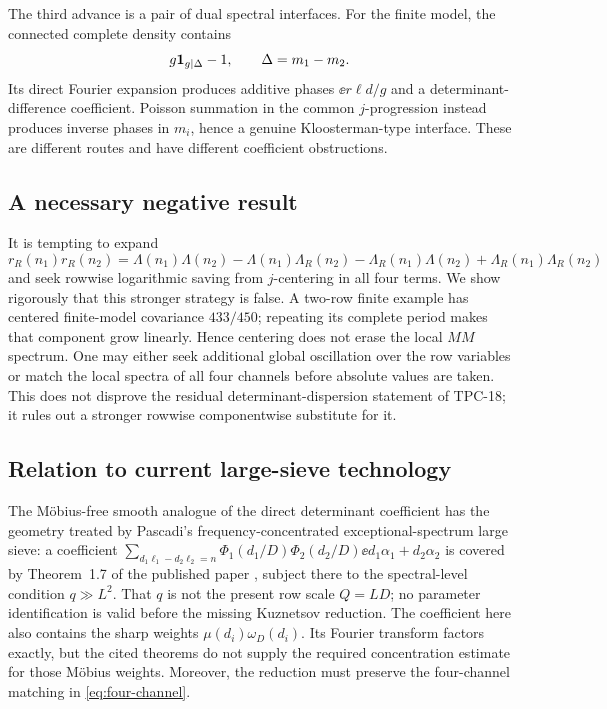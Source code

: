 The third advance is a pair of dual spectral interfaces.  For the
finite model, the connected complete density contains
\[
 g\mathbf 1_{g\mid\Delta}-1,
 \qquad \Delta=m_1-m_2.
\]
Its direct Fourier expansion produces additive phases
\(\ee{r\ell d/g}\) and a determinant-difference coefficient.  Poisson
summation in the common \(j\)-progression instead produces inverse
phases in \(m_i\), hence a genuine Kloosterman-type interface.  These
are different routes and have different coefficient obstructions.

\subsection{A necessary negative result}

It is tempting to expand
\begin{equation}
 r_R(n_1)r_R(n_2)
 =\Lambda(n_1)\Lambda(n_2)
 -\Lambda(n_1)\Lambda_R(n_2)
 -\Lambda_R(n_1)\Lambda(n_2)
 +\Lambda_R(n_1)\Lambda_R(n_2)
 \label{eq:four-channel}
\end{equation}
and seek rowwise logarithmic saving from \(j\)-centering in all four
terms.  We show rigorously that this stronger strategy is false.  A
two-row finite example has centered
finite-model covariance \(433/450\); repeating its complete period
makes that component grow linearly.  Hence centering does not erase
the local \(MM\) spectrum.  One may either seek additional global
oscillation over the row variables or match the local spectra of all
four channels before absolute values are taken.  This does not
disprove the residual determinant-dispersion statement of TPC-18; it
rules out a stronger rowwise componentwise substitute for it.

\subsection{Relation to current large-sieve technology}

The M\"obius-free smooth analogue of the direct determinant
coefficient has the geometry treated by Pascadi's
frequency-concentrated exceptional-spectrum large sieve: a coefficient
\(
 \sum_{d_1\ell_1-d_2\ell_2=n}
 \Phi_1(d_1/D)\Phi_2(d_2/D)
 \ee{d_1\alpha_1+d_2\alpha_2}
\)
is covered by Theorem~1.7 of the published paper
\citep{Pascadi2026LargeSieve}, subject there to the spectral-level
condition \(q\gg L^2\).  That \(q\) is not the present row scale
\(Q=LD\); no parameter identification is valid before the missing
Kuznetsov reduction.  The coefficient here also contains the sharp
weights \(\mu(d_i)\omega_D(d_i)\).  Its Fourier transform factors
exactly, but the cited theorems do not supply the required
concentration estimate for those M\"obius weights.  Moreover, the reduction must
preserve the four-channel matching in \eqref{eq:four-channel}.

